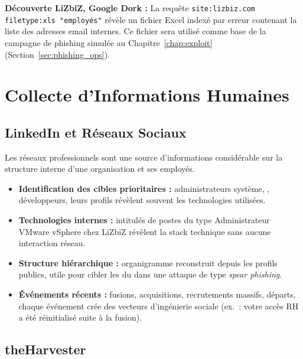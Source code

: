 \begin{boxlizbiz}
\textbf{Découverte LiZbiZ, Google Dork :}
La requête \texttt{site:lizbiz.com filetype:xls "employés"} révèle un
fichier Excel indexé par erreur contenant la liste des adresses email
internes. Ce fichier sera utilisé comme base de la campagne de phishing
simulée au Chapitre~\ref{chap:exploit} (Section~\ref{sec:phishing_ops}).
\end{boxlizbiz}

\section{Collecte d'Informations Humaines}
\label{sec:humint}

\subsection{LinkedIn et Réseaux Sociaux}
\label{subsec:linkedin}

Les réseaux professionnels sont une source d'informations considérable sur
la structure interne d'une organisation et ses employés.

\begin{itemize}
    \item \textbf{Identification des cibles prioritaires :} administrateurs
          système, , développeurs, leurs profils révèlent
          souvent les technologies utilisées.
    \item \textbf{Technologies internes :}  intitulés de postes du type
          \og{}Administrateur VMware vSphere chez LiZbiZ\fg{} révèlent
          la stack technique sans aucune interaction réseau.
    \item \textbf{Structure hiérarchique :} organigramme reconstruit depuis
          les profils publics, utile pour cibler les  du
           dans une attaque de type \textit{spear phishing}.
    \item \textbf{Événements récents :} fusions, acquisitions, recrutements
          massifs, départs, chaque événement crée des vecteurs d'ingénierie
          sociale (ex.~: \og{}votre accès RH a été réinitialisé suite à la
          fusion\fg{}).
\end{itemize}

\subsection{theHarvester}
\label{subsec:theharvester}


